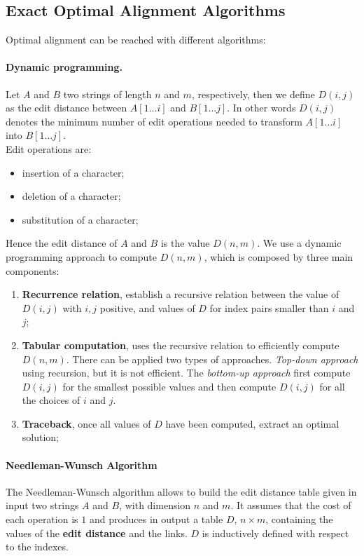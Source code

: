 \subsection{Exact Optimal Alignment Algorithms}
Optimal alignment can be reached with different algorithms:

\paragraph{Dynamic programming.} Let $A$ and $B$ two strings of length $n$ and $m$, respectively, then we define $D(i,j)$ as the edit distance between $A[1\dots i]$ and $B[1\dots j]$. In other words $D(i,j)$ denotes the minimum number of edit operations needed to transform $A[1\dots i]$ into $B[1\dots j]$.\\
Edit operations are:
\begin{itemize}
	\item insertion of a character;
	\item deletion of a character;
	\item substitution of a character;
\end{itemize}
Hence the edit distance of $A$ and $B$ is the value $D(n,m)$. We use a dynamic programming approach to compute $D(n,m)$, which is composed by three main components:
\begin{enumerate}
	\item \textbf{Recurrence relation}, establish a recursive relation between the value of $D(i,j)$ with $i,j$ positive, and values of $D$ for index pairs smaller than $i$ and $j$;
	\item \textbf{Tabular computation}, uses the recursive relation to efficiently compute $D(n,m)$. There can be applied two types of approaches. \textit{Top-down approach} using recursion, but it is not efficient. The \textit{bottom-up approach} first compute $D(i,j)$ for the smallest possible values and then compute $D(i,j)$ for all the choices of $i$ and $j$.
	\item \textbf{Traceback}, once all values of $D$ have been computed, extract an optimal solution;
\end{enumerate}


\paragraph{Needleman-Wunsch Algorithm}
The Needleman-Wunsch algorithm allows to build the edit distance table given in input two strings $A$ and $B$, with dimension $n$ and $m$. It assumes that the cost of each operation is $1$ and produces in output a table $D$, $n\times m$, containing the values of the \textbf{edit distance} and the links.  $D$ is inductively defined with respect to the indexes.

